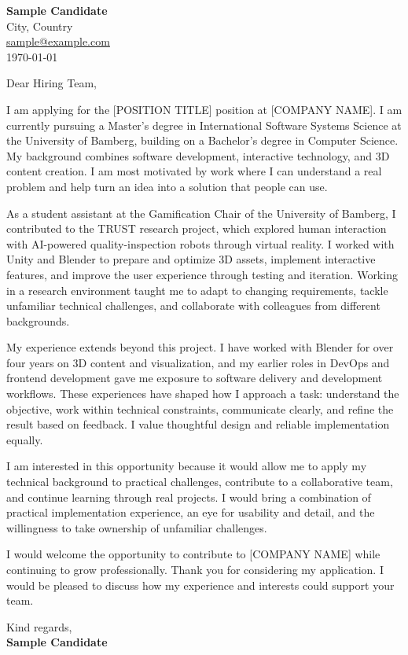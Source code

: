 \documentclass[11pt,a4paper]{article}
\makeatletter
\newcommand{\ApplicantName}{Sample Candidate}
\newcommand{\ApplicantLocation}{City, Country}
\newcommand{\ApplicantEmail}{sample@example.com}
\newcommand{\TargetPosition}{[POSITION TITLE]}
\newcommand{\TargetCompany}{[COMPANY NAME]}
\newcommand{\LetterDate}{\today}
\newcommand{\RoleMotivation}{%
I am interested in this opportunity because it would allow me to apply my technical background to practical challenges, contribute to a collaborative team, and continue learning through real projects.%
}
\newcommand{\RoleContribution}{%
I would bring a combination of practical implementation experience, an eye for usability and detail, and the willingness to take ownership of unfamiliar challenges.%
}
\newcommand{\AvailabilitySentence}{}
\makeatother
\begin{document}
{\fontsize{13}{15}\selectfont\textbf{\ApplicantName}}\\[4pt]
\ApplicantLocation\\[4pt]
\href{mailto:\ApplicantEmail}{\ApplicantEmail}\\[10pt]
\LetterDate

\vspace{8pt}
Dear Hiring Team,

I am applying for the \TargetPosition{} position at \TargetCompany{}. I am currently pursuing a Master's degree in International Software Systems Science at the University of Bamberg, building on a Bachelor's degree in Computer Science. My background combines software development, interactive technology, and 3D content creation. I am most motivated by work where I can understand a real problem and help turn an idea into a solution that people can use.

As a student assistant at the Gamification Chair of the University of Bamberg, I contributed to the TRUST research project, which explored human interaction with AI-powered quality-inspection robots through virtual reality. I worked with Unity and Blender to prepare and optimize 3D assets, implement interactive features, and improve the user experience through testing and iteration. Working in a research environment taught me to adapt to changing requirements, tackle unfamiliar technical challenges, and collaborate with colleagues from different backgrounds.

My experience extends beyond this project. I have worked with Blender for over four years on 3D content and visualization, and my earlier roles in DevOps and frontend development gave me exposure to software delivery and development workflows. These experiences have shaped how I approach a task: understand the objective, work within technical constraints, communicate clearly, and refine the result based on feedback. I value thoughtful design and reliable implementation equally.

\RoleMotivation{} \RoleContribution{}

I would welcome the opportunity to contribute to \TargetCompany{} while continuing to grow professionally. \AvailabilitySentence{} Thank you for considering my application. I would be pleased to discuss how my experience and interests could support your team.

\vspace{8pt}
Kind regards,\\[6pt]
\textbf{\ApplicantName}
\end{document}
